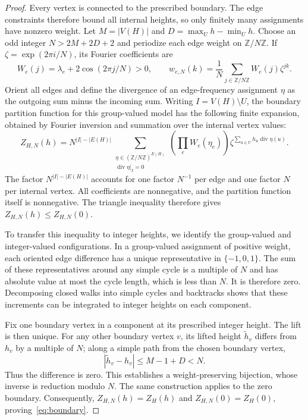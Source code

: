 \documentclass[11pt,reqno]{amsart}
\theoremstyle{remark}
\numberwithin{equation}{section}
\newcommand{\Z}{\mathbb Z}
\DeclareMathOperator{\diver}{div}
\begin{document}
\begin{proof}
Every vertex is connected to the prescribed boundary. The edge
constraints therefore bound all internal heights, so only finitely
many assignments have nonzero weight. Let $M=|V(H)|$ and
$D=\max_U h-\min_U h$. Choose an odd integer $N>2M+2D+2$ and
periodize each edge weight on $\Z/N\Z$. If
$\zeta=\exp(2\pi i/N)$, its Fourier coefficients are
\[
 W_e(j)=\lambda_e+2\cos(2\pi j/N)>0,
 \qquad
 w_{e,N}(k)=\frac1N\sum_{j\in\Z/N\Z}W_e(j)\zeta^{jk}.
\]
Orient all edges and define the divergence of an edge-frequency
assignment $\eta$ as the outgoing sum minus the incoming sum.
Writing $I=V(H)\setminus U$, the boundary partition function for this
group-valued model has the following finite expansion, obtained by
Fourier inversion and summation over the internal vertex values:
\begin{equation}\label{eq:fourier-boundary}
 Z_{H,N}(h)=N^{|I|-|E(H)|}
 \sum_{\substack{\eta\in(\Z/N\Z)^{E(H)}\\
                  \diver\eta|_I=0}}
       \left(\prod_e W_e(\eta_e)\right)
       \zeta^{\sum_{u\in U}h_u\diver\eta(u)}.
\end{equation}
The factor $N^{|I|-|E(H)|}$ accounts for one factor $N^{-1}$ per edge
and one factor $N$ per internal vertex. All coefficients are nonnegative,
and the partition function itself is nonnegative. The triangle
inequality therefore gives
$Z_{H,N}(h)\le Z_{H,N}(0)$.

To transfer this inequality to integer heights, we identify the
group-valued and integer-valued configurations. In a group-valued assignment of positive weight, each oriented
edge difference has a unique representative in $\{-1,0,1\}$.
The sum of these representatives around any simple cycle is a multiple
of $N$ and has absolute value at most the cycle length, which is less
than $N$. It is therefore zero. Decomposing closed walks into simple
cycles and backtracks shows that these increments can be integrated
to integer heights on each component.

Fix one boundary vertex in a component at its prescribed integer height.
The lift is then unique. For any other boundary vertex $v$, its lifted
height $\widetilde h_v$ differs from $h_v$ by a multiple of $N$; along a
simple path from the chosen boundary vertex,
\[
 |\widetilde h_v-h_v|\le M-1+D<N.
\]
Thus the difference is zero. This establishes a weight-preserving
bijection, whose inverse is reduction modulo $N$. The same construction
applies to the zero boundary. Consequently, $Z_{H,N}(h)=Z_H(h)$ and
$Z_{H,N}(0)=Z_H(0)$, proving~\eqref{eq:boundary}.
\end{proof}
\end{document}
